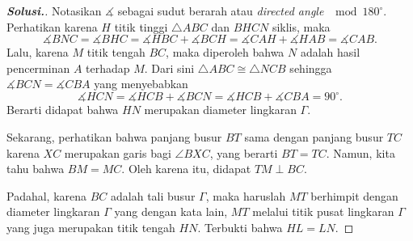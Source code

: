\documentclass[12pt]{scrartcl}
\begin{document}
\begin{center}
\begin{tikzpicture}[line cap=round,line join=round,>=triangle 45,x=1cm,y=1cm,scale=0.55]
 \end{tikzpicture}
 \end{center}
 
  \begin{proof}[\textbf{Solusi.}]
  Notasikan $\measuredangle$ sebagai sudut berarah atau \textit{directed angle} $\mod 180^\circ$.
  Perhatikan karena $H$ titik tinggi $\triangle ABC$ dan $BHCN$ siklis, maka $$\measuredangle BNC = \measuredangle BHC = \measuredangle HBC + \measuredangle BCH = \measuredangle CAH + \measuredangle HAB = \measuredangle CAB.$$ Lalu, karena $M$ titik tengah $BC$, maka diperoleh bahwa $N$ adalah hasil pencerminan $A$ terhadap $M$. Dari sini $\triangle ABC \cong \triangle NCB$ sehingga $\measuredangle BCN = \measuredangle CBA$ yang menyebabkan
 $$\measuredangle HCN = \measuredangle HCB + \measuredangle BCN = \measuredangle HCB + \measuredangle CBA = 90^\circ.$$
 Berarti didapat bahwa $HN$ merupakan diameter lingkaran $\Gamma$. 
 
 Sekarang, perhatikan bahwa panjang  busur $BT$ sama dengan panjang busur $TC$ karena $XC$ merupakan garis bagi $\angle BXC$, yang berarti $BT=TC$. Namun, kita tahu bahwa $BM=MC$. Oleh karena itu, didapat $TM \perp BC$.
 
 Padahal, karena $BC$ adalah tali busur $\Gamma$, maka haruslah $MT$ berhimpit dengan diameter lingkaran $\Gamma$ yang dengan kata lain, $MT$ melalui titik pusat lingkaran $\Gamma$ yang juga merupakan titik tengah $HN$. Terbukti bahwa $HL = LN$.
 \end{proof}
\end{document}
